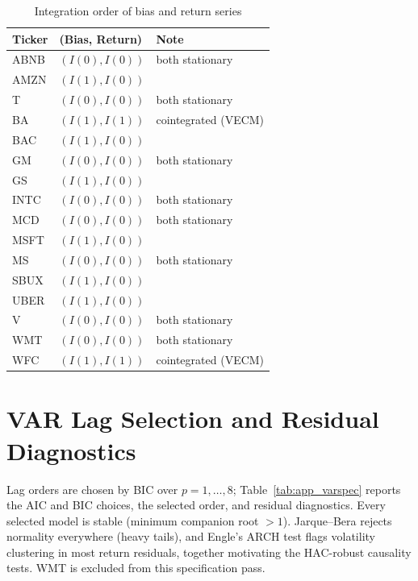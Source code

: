 \documentclass[conference]{IEEEtran}
\begin{document}
\begin{table}[!t]
\caption{Integration order of bias and return series}
\label{tab:app_stat}
\centering
\small
\begin{tabular}{lll}
\toprule
Ticker & (Bias, Return) & Note \\
\midrule
ABNB & $(I(0),I(0))$ & both stationary \\
AMZN & $(I(1),I(0))$ & \\
T    & $(I(0),I(0))$ & both stationary \\
BA   & $(I(1),I(1))$ & cointegrated (VECM) \\
BAC  & $(I(1),I(0))$ & \\
GM   & $(I(0),I(0))$ & both stationary \\
GS   & $(I(1),I(0))$ & \\
INTC & $(I(0),I(0))$ & both stationary \\
MCD  & $(I(0),I(0))$ & both stationary \\
MSFT & $(I(1),I(0))$ & \\
MS   & $(I(0),I(0))$ & both stationary \\
SBUX & $(I(1),I(0))$ & \\
UBER & $(I(1),I(0))$ & \\
V    & $(I(0),I(0))$ & both stationary \\
WMT  & $(I(0),I(0))$ & both stationary \\
WFC  & $(I(1),I(1))$ & cointegrated (VECM) \\
\bottomrule
\end{tabular}
\end{table}

\section{VAR Lag Selection and Residual Diagnostics}
\label{app:varspec}
Lag orders are chosen by BIC over $p=1,\dots,8$; Table~\ref{tab:app_varspec}
reports the AIC and BIC choices, the selected order, and residual diagnostics.
Every selected model is stable (minimum companion root $>1$). Jarque--Bera
rejects normality everywhere (heavy tails), and Engle's ARCH test flags
volatility clustering in most return residuals, together motivating the
HAC-robust causality tests. WMT is excluded from this specification pass.
\end{document}

